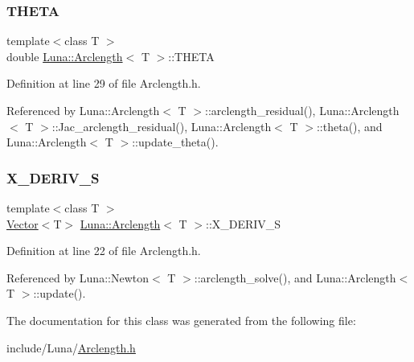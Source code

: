 \mbox{\label{classLuna_1_1Arclength_aa17766cf4bcbe5b063dc2a95f89baf42}} 
\subsubsection{\texorpdfstring{T\+H\+E\+TA}{THETA}}
{\footnotesize\ttfamily template$<$class T $>$ \\
double \hyperlink{classLuna_1_1Arclength}{Luna\+::\+Arclength}$<$ T $>$\+::T\+H\+E\+TA\hspace{0.3cm}{\ttfamily [protected]}}



Definition at line 29 of file Arclength.\+h.



Referenced by Luna\+::\+Arclength$<$ T $>$\+::arclength\+\_\+residual(), Luna\+::\+Arclength$<$ T $>$\+::\+Jac\+\_\+arclength\+\_\+residual(), Luna\+::\+Arclength$<$ T $>$\+::theta(), and Luna\+::\+Arclength$<$ T $>$\+::update\+\_\+theta().

\mbox{\label{classLuna_1_1Arclength_a0108e51178f63927883af0b0022c29ad}} 
\subsubsection{\texorpdfstring{X\+\_\+\+D\+E\+R\+I\+V\+\_\+S}{X\_DERIV\_S}}
{\footnotesize\ttfamily template$<$class T $>$ \\
\hyperlink{classLuna_1_1Vector}{Vector}$<$T$>$ \hyperlink{classLuna_1_1Arclength}{Luna\+::\+Arclength}$<$ T $>$\+::X\+\_\+\+D\+E\+R\+I\+V\+\_\+S\hspace{0.3cm}{\ttfamily [protected]}}



Definition at line 22 of file Arclength.\+h.



Referenced by Luna\+::\+Newton$<$ T $>$\+::arclength\+\_\+solve(), and Luna\+::\+Arclength$<$ T $>$\+::update().



The documentation for this class was generated from the following file\+:\begin{DoxyCompactItemize}
\item 
include/\+Luna/\hyperlink{Arclength_8h}{Arclength.\+h}\end{DoxyCompactItemize}
